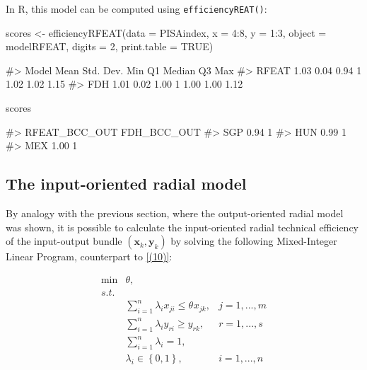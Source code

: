 In R, this model can be computed using \texttt{efficiencyREAT()}:

\begin{Schunk}
\begin{Sinput}
scores <- efficiencyRFEAT(data = PISAindex, x = 4:8, y = 1:3, object = modelRFEAT, 
                          digits = 2, print.table = TRUE)
\end{Sinput}
\begin{Soutput}
#>  Model Mean Std. Dev.  Min Q1 Median   Q3  Max
#>  RFEAT 1.03      0.04 0.94  1   1.02 1.02 1.15
#>    FDH 1.01      0.02 1.00  1   1.00 1.00 1.12
\end{Soutput}
\begin{Sinput}
scores %>% sample_n(3)
\end{Sinput}
\begin{Soutput}
#>     RFEAT_BCC_OUT FDH_BCC_OUT
#> SGP          0.94           1
#> HUN          0.99           1
#> MEX          1.00           1
\end{Soutput}
\end{Schunk}

\hypertarget{the-input-oriented-radial-model}{%
\subsection{The input-oriented radial
model}\label{the-input-oriented-radial-model}}

By analogy with the previous section, where the output-oriented radial
model was shown, it is possible to calculate the input-oriented radial
technical efficiency of the input-output bundle
\((\textbf{x}_k, \textbf{y}_k)\) by solving the following Mixed-Integer
Linear Program, counterpart to \eqref{(10)}:

\begin{equation} \label{(15)} 
\begin{array}{lllll} {} & {\min } & {\theta, } & {} & {} \\ 
{} & {s.t.} & {} & {} & {} \\ 
{} & {} & {\sum_{i=1}^{n}\lambda_{i} x_{ji}  \le \theta_{} x_{jk} ,} & {j=1,...,m} & {} \\ 
{} & {} & {\sum_{i=1}^{n}\lambda_{i} y_{ri}  \ge y_{rk} ,} & {r=1,...,s} & {} \\ 
{} & {} & {\sum_{i=1}^{n}\lambda_{i}  =1,} & {} & {} \\ 
{} & {} & {\lambda_{i} \in \left\{0,1\right\},} & {i=1,...,n} & {} 
\end{array} 
\end{equation}

